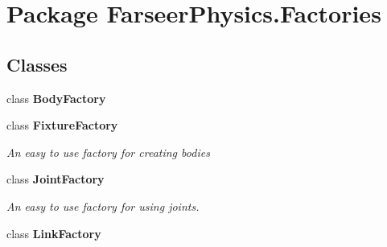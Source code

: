 \hypertarget{namespace_farseer_physics_1_1_factories}{\section{Package Farseer\+Physics.\+Factories}
\label{namespace_farseer_physics_1_1_factories}
}
\subsection*{Classes}
\begin{DoxyCompactItemize}
\item 
class {\bfseries Body\+Factory}
\item 
class {\bfseries Fixture\+Factory}
\begin{DoxyCompactList}\small\item\em An easy to use factory for creating bodies \end{DoxyCompactList}\item 
class {\bfseries Joint\+Factory}
\begin{DoxyCompactList}\small\item\em An easy to use factory for using joints. \end{DoxyCompactList}\item 
class {\bfseries Link\+Factory}
\end{DoxyCompactItemize}
